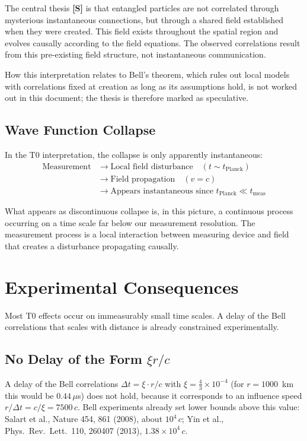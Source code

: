 	The central thesis \textbf{[S]} is that entangled particles are not correlated through mysterious instantaneous connections, but through a shared field established when they were created. This field exists throughout the spatial region and evolves causally according to the field equations. The observed correlations result from this pre-existing field structure, not instantaneous communication.

	How this interpretation relates to Bell's theorem, which rules out local models with correlations fixed at creation as long as its assumptions hold, is not worked out in this document; the thesis is therefore marked as speculative.
	
	\subsection{Wave Function Collapse}
	
	In the T0 interpretation, the collapse is only apparently instantaneous:
	\begin{align}
		\text{Measurement} &\rightarrow \text{Local field disturbance} \quad (t \sim t_{\text{Planck}}) \\
		&\rightarrow \text{Field propagation} \quad (v = c) \\
		&\rightarrow \text{Appears instantaneous since } t_{\text{Planck}} \ll t_{\text{meas}}
	\end{align}
	
	What appears as discontinuous collapse is, in this picture, a continuous process occurring on a time scale far below our measurement resolution. The measurement process is a local interaction between measuring device and field that creates a disturbance propagating causally.
	
	\section{Experimental Consequences}
	
	Most T0 effects occur on immeasurably small time scales. A delay of the Bell correlations that scales with distance is already constrained experimentally.
	
	\subsection{No Delay of the Form $\xi r/c$}
	
	A delay of the Bell correlations $\Delta t = \xi \cdot r/c$ with $\xi = \frac{4}{3} \times 10^{-4}$ (for $r = 1000$~km this would be $0.44\,\mu$s) does not hold, because it corresponds to an influence speed $r/\Delta t = c/\xi = 7500\,c$. Bell experiments already set lower bounds above this value: Salart et al., Nature 454, 861 (2008), about $10^4\,c$; Yin et al., Phys.\ Rev.\ Lett.\ 110, 260407 (2013), $1.38\times10^4\,c$.
	

